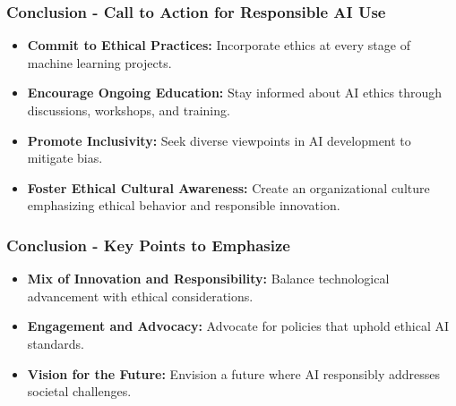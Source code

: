 \documentclass[aspectratio=169]{beamer}
\begin{document}
\begin{frame}[fragile]
    \frametitle{Conclusion - Call to Action for Responsible AI Use}
    \begin{itemize}
        \item \textbf{Commit to Ethical Practices:}
            Incorporate ethics at every stage of machine learning projects.
        \item \textbf{Encourage Ongoing Education:}
            Stay informed about AI ethics through discussions, workshops, and training.
        \item \textbf{Promote Inclusivity:}
            Seek diverse viewpoints in AI development to mitigate bias.
        \item \textbf{Foster Ethical Cultural Awareness:}
            Create an organizational culture emphasizing ethical behavior and responsible innovation.
    \end{itemize}
\end{frame}

\begin{frame}[fragile]
    \frametitle{Conclusion - Key Points to Emphasize}
    \begin{itemize}
        \item \textbf{Mix of Innovation and Responsibility:} 
            Balance technological advancement with ethical considerations.
        \item \textbf{Engagement and Advocacy:} 
            Advocate for policies that uphold ethical AI standards.
        \item \textbf{Vision for the Future:} 
            Envision a future where AI responsibly addresses societal challenges.
    \end{itemize}
\end{frame}
\end{document}
